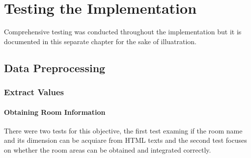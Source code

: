 \documentclass[12pt,twoside]{report}
\begin{document}
\chapter{Testing the Implementation}
Comprehensive testing was conducted throughout the implementation but it is documented in this separate chapter for the sake of illuatration. 

\section{Data Preprocessing}

\subsection{Extract Values}

\subsubsection{Obtaining Room Information}
There were two tests for this objective, the first test examing if the room name and its dimension can be acquiare from HTML texts and the second test focuses on whether the room areas can be obtained and integrated correctly. 
\\
\end{document}
